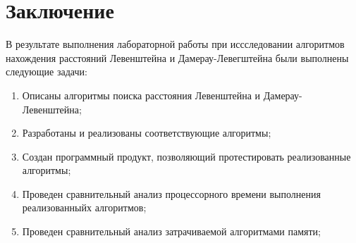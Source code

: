 \chapter*{Заключение}

В результате выполнения лабораторной работы при иссследовании алгоритмов нахождения расстояний Левенштейна и Дамерау-Левегштейна были выполнены следующие задачи:
\begin{enumerate}
    \item Описаны алгоритмы поиска расстояния Левенштейна и Дамерау-Левенштейна;
    \item Разработаны и реализованы соответствующие алгоритмы;
    \item Создан программный продукт, позволяющий протестировать реализованные алгоритмы;
    \item Проведен сравнительный анализ процессорного времени выполнения реализованныйх алгоритмов;
    \item Проведен сравнительный анализ затрачиваемой алгоритмами памяти;
\end{enumerate}